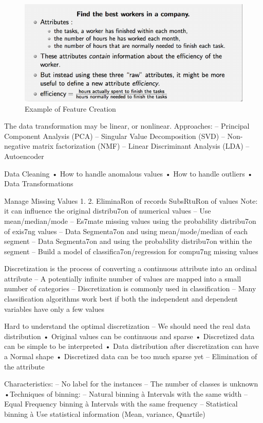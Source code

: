 \begin{description}
                               \begin{figure}
                                    \caption{Example of Feature Creation}
                                    \label{img:featureCreation}
                                    \includegraphics[width=\textwidth]{Images/featureCreation}
                               \end{figure}
The data transformation may be linear, or nonlinear.
Approaches:
–
 Principal Component Analysis (PCA)
–
 Singular Value Decomposition (SVD)
–
 Non-negative matrix factorization (NMF)
–
 Linear Discriminant Analysis (LDA)
–
 Autoencoder


\end{description}
Data Cleaning
• How to handle anomalous values
• How to handle outliers
• Data Transformations

Manage Missing Values
1.
2.
EliminaRon of records
SubsRtuRon of values
Note: it can influence the original distribu7on of numerical values
–
 Use mean/median/mode
–
 Es7mate missing values using the probability distribu7on of
exis7ng values
–
 Data Segmenta7on and using mean/mode/median of each
segment
–
 Data Segmenta7on and using the probability distribu7on within
the segment
–
 Build a model of classifica7on/regression for compu7ng missing
values

Discretization is the process of converting a
continuous attribute into an ordinal attribute
– A potentially infinite number of values are mapped into a
small number of categories
– Discretization is commonly used in classification
– Many classification algorithms work best if both the
independent and dependent variables have only a few
values

Hard to understand the optimal discretization
– We should need the real data distribution
• Original values can be continuous and sparse
• Discretized data can be simple to be interpreted
• Data distribution after discretization can have a Normal shape
• Discretized data can be too much sparse yet
– Elimination of the attribute

Characteristics:
– No label for the instances
– The number of classes is unknown
•Techniques of binning:
– Natural binning
 à Intervals with the same width
– Equal Frequency binning à Intervals with the same frequency
– Statistical binning
 à Use statistical information (Mean, variance,
Quartile)

